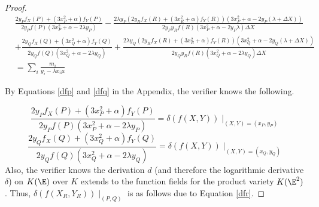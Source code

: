 \documentclass[11pt,letterpaper]{article}
\theoremstyle{definition}
\newcommand{\6}{\mathbf}
\newcommand{\7}{\mathcal}
\begin{document}
\begin{proof}
\begin{align*}
    & \frac{2y_Pf_X(P) + (3x_P^2+\alpha) f_Y(P)}{2y_Pf(P)(3x_P^2+\alpha-2\lambda y_P)} 
    - \frac{2\lambda y_P(2y_Rf_X(R) + (3x_R^2+\alpha) f_Y(R))(3x_P^2+\alpha - 2y_P(\lambda + \Delta X))}{2y_Py_Rf(R)(3x_P^2+\alpha-2y_P \lambda ) \Delta X} \\
    &+ \frac{2y_Qf_X(Q) + (3x_Q^2+\alpha) f_Y(Q)}{2y_Qf(Q)(3x_Q^2+\alpha - 2\lambda y_Q)} + \frac{2\lambda y_Q(2y_Rf_X(R) + (3x_R^2+\alpha)f_Y(R))(3x_Q^2+\alpha - 2y_Q(\lambda + \Delta X))}{2y_Qy_Rf(R)(3x_Q^2+\alpha  - 2\lambda y_Q) \Delta X} \\
    &= \sum_i \frac{m_i}{y_i-\lambda x_i \mu}
\end{align*}

By Equations \ref{dfp} and \ref{dfq} in the Appendix, the verifier knows the following.

\[\frac{2y_Pf_X(P) + (3x_P^2+\alpha) f_Y(P)}{2y_Pf(P)(3x_P^2+\alpha-2\lambda y_P)} = \delta(f(X,Y))\mid_{(X, Y)=(x_P,y_P)}\]
\[\frac{2y_Qf_X(Q) + (3x_Q^2+\alpha) f_Y(Q)}{2y_Qf(Q)(3x_Q^2+\alpha - 2\lambda y_Q)} = \delta(f(X,Y))\mid_{(X,Y)=(x_Q,y_Q)}\]
Also, the verifier knows the derivation $d$ (and therefore the logarithmic derivative $\delta$) on $K(\E)$ over $K$ extends to the function fields for the product variety $K(\E^2)$. Thus, $\delta(f(X_R, Y_R))\mid_{(P,Q)}$ is as follows due to Equation \ref{dfr}.




\end{proof}
\end{document}
